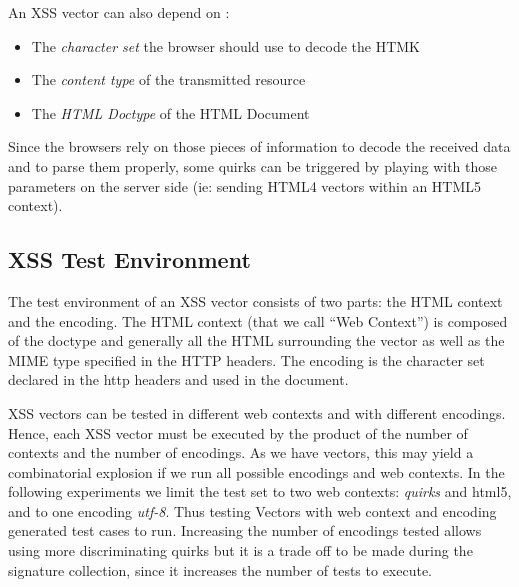 \documentclass[10pt]{IEEEtran}
\begin{document}
An XSS vector can also depend on :
\begin{itemize}
\item The  \emph{character set} the browser should use to decode the HTMK 
\item The  \emph{content type} of the transmitted resource
\item The  \emph{HTML Doctype} of the HTML Document
\end{itemize}




Since the browsers rely on those pieces of information to decode the received data and to 
parse them properly, some quirks can be triggered by playing with those 
parameters on the server side (ie: sending HTML4 vectors within an HTML5 context).




\subsection{XSS Test Environment}
The test environment of an XSS vector consists of two parts:
the HTML context and the encoding. The HTML context (that we call ``Web Context'') 
is composed of  the doctype and generally all the HTML surrounding the vector as well 
as the  MIME type specified in the HTTP headers. The encoding is the character set 
declared in the http headers and used in the document.




XSS vectors can be tested in different web contexts and with different encodings. 
Hence, each XSS vector must be executed by the product of the number of contexts and the 
number of encodings. As we have  vectors, this may yield a combinatorial explosion if we run all possible encodings and web contexts. 
In the following experiments we limit the test set to two web contexts: \textit{quirks} and html5, and to one encoding \textit{utf-8}. Thus testing  Vectors 
with  web context and  encoding generated  test cases to run.
Increasing the number of encodings tested allows using more discriminating quirks
but it is a trade off to be made during the signature collection, since it increases the number of tests to execute.
\end{document}
